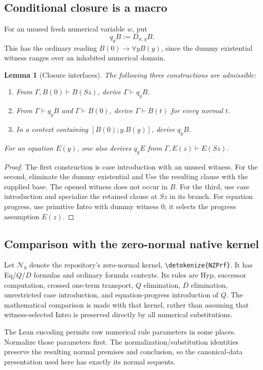 \documentclass[11pt]{article}
\newtheorem{lemma}[theorem]{Lemma}
\theoremstyle{definition}
\newcommand{\NZ}{\mathcal N_0}
\newcommand{\file}[1]{\expandafter\nolinkurl\expandafter{\detokenize{#1}}}
\begin{document}
\subsection{Conditional closure is a macro}

For an unused fresh numerical variable $w$, put
\[
                       q_yB:=D_{w,y}B.
\]
This has the ordinary reading $B(0)\to\forall yB(y)$, since the
dummy existential witness ranges over an inhabited numerical domain.

\begin{lemma}[Closure interfaces]\label{lem:qinterfaces}
The following three constructions are admissible:
\begin{enumerate}
\item From $\Gamma,B(0)\vdash B(Sz)$, derive $\Gamma\vdash q_yB$.
\item From $\Gamma\vdash q_yB$ and $\Gamma\vdash B(0)$, derive
      $\Gamma\vdash B(t)$ for every normal $t$.
\item In a context containing $[B(0);y.B(y)]$, derive $q_yB$.
\end{enumerate}
For an equation $E(y)$, one also derives $q_yE$ from
$\Gamma,E(z)\vdash E(Sz)$.
\end{lemma}
\begin{proof}
The first construction is case introduction with an unused witness.
For the second, eliminate the dummy existential and Use the resulting
clause with the supplied base. The opened witness does not occur in $B$.
For the third, use case introduction and specialize the retained clause
at $Sz$ in its branch. For equation progress, use primitive Intro with
dummy witness $0$; it selects the progress assumption $E(z)$.
\end{proof}

\subsection{Comparison with the zero-normal native kernel}

Let $\NZ$ denote the repository's zero-normal kernel, \file{NZPrf}.
It has Eq/$Q$/$D$ formulas and ordinary formula contexts. Its rules
are Hyp, successor computation, crossed one-term transport, $Q$
elimination, $D$ elimination, unrestricted case introduction, and
equation-progress introduction of $Q$. The mathematical comparison is
made with that kernel, rather than assuming that witness-selected Intro
is preserved directly by all numerical substitutions.

The Lean encoding permits raw numerical rule parameters in some places.
Normalize those parameters first. The normalization/substitution identities
preserve the resulting normal premises and conclusion, so the canonical-data
presentation used here has exactly its normal sequents.
\end{document}

